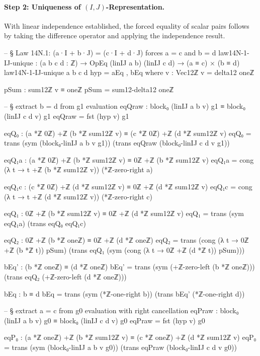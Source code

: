 \documentclass[11pt,a4paper]{book}
\begin{document}
\paragraph{Step 2: Uniqueness of $(I,J)$-Representation.}
With linear independence established, the forced equality of
scalar pairs follows by taking the difference operator and
applying the independence result.

\begin{code}
-- § Law 14N.1: (a·I + b·J) = (c·I + d·J) forces a = c and b = d
law14N-1-IJ-unique : (a b c d : ℤ) → OpEq (linIJ a b) (linIJ c d) → (a ≡ c) × (b ≡ d)
law14N-1-IJ-unique a b c d hyp = aEq , bEq
  where
    v : Vec12ℤ
    v = delta12 oneℤ

    pSum : sum12ℤ v ≡ oneℤ
    pSum = sum12-delta12 oneℤ

    -- § extract b = d from g1 evaluation
    eqQraw : block₀ (linIJ a b v) g1 ≡ block₀ (linIJ c d v) g1
    eqQraw = fst (hyp v) g1

    eqQ₀ : (a *ℤ 0ℤ) +ℤ (b *ℤ sum12ℤ v) ≡ (c *ℤ 0ℤ) +ℤ (d *ℤ sum12ℤ v)
    eqQ₀ =
      trans (sym (block₀-linIJ a b v g1))
        (trans eqQraw (block₀-linIJ c d v g1))

    eqQ₁a : (a *ℤ 0ℤ) +ℤ (b *ℤ sum12ℤ v) ≡ 0ℤ +ℤ (b *ℤ sum12ℤ v)
    eqQ₁a = cong (λ t → t +ℤ (b *ℤ sum12ℤ v)) (*ℤ-zero-right a)

    eqQ₁c : (c *ℤ 0ℤ) +ℤ (d *ℤ sum12ℤ v) ≡ 0ℤ +ℤ (d *ℤ sum12ℤ v)
    eqQ₁c = cong (λ t → t +ℤ (d *ℤ sum12ℤ v)) (*ℤ-zero-right c)

    eqQ₁ : 0ℤ +ℤ (b *ℤ sum12ℤ v) ≡ 0ℤ +ℤ (d *ℤ sum12ℤ v)
    eqQ₁ = trans (sym eqQ₁a) (trans eqQ₀ eqQ₁c)

    eqQ₂ : 0ℤ +ℤ (b *ℤ oneℤ) ≡ 0ℤ +ℤ (d *ℤ oneℤ)
    eqQ₂ =
      trans
        (cong (λ t → 0ℤ +ℤ (b *ℤ t)) pSum)
        (trans eqQ₁ (sym (cong (λ t → 0ℤ +ℤ (d *ℤ t)) pSum)))

    bEq' : (b *ℤ oneℤ) ≡ (d *ℤ oneℤ)
    bEq' =
      trans
        (sym (+ℤ-zero-left (b *ℤ oneℤ)))
        (trans eqQ₂ (+ℤ-zero-left (d *ℤ oneℤ)))

    bEq : b ≡ d
    bEq =
      trans (sym (*ℤ-one-right b))
        (trans bEq' (*ℤ-one-right d))

    -- § extract a = c from g0 evaluation with right cancellation
    eqPraw : block₀ (linIJ a b v) g0 ≡ block₀ (linIJ c d v) g0
    eqPraw = fst (hyp v) g0

    eqP₀ : (a *ℤ oneℤ) +ℤ (b *ℤ sum12ℤ v) ≡ (c *ℤ oneℤ) +ℤ (d *ℤ sum12ℤ v)
    eqP₀ =
      trans (sym (block₀-linIJ a b v g0))
        (trans eqPraw (block₀-linIJ c d v g0))


\end{code}
\end{document}
